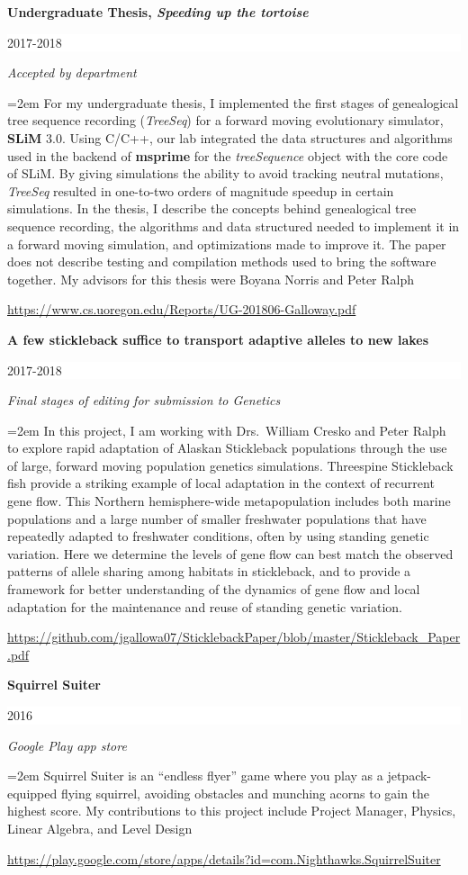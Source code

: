 \documentclass[paper=a4,fontsize=11pt]{scrartcl} %
\newcommand{\sepspace}{\vspace*{1em}}		%
\newcommand{\EducationEntry}[4]{
		\noindent \textbf{#1} \hfill      %
		\colorbox{White}{%
			\parbox{6em}{%
			\hfill\color{Black}#2}} \par  %
		\noindent \textit{#3} \par        %
		\noindent\hangindent=2em\hangafter=0 \small #4 %
		\normalsize \par}
\begin{document}
\EducationEntry{Undergraduate Thesis, \textit{Speeding up the tortoise}}{2017-2018}{Accepted by department}
{For my undergraduate thesis, I implemented the first stages of genealogical tree sequence recording (\textit{TreeSeq}) for 
a forward moving evolutionary simulator, \textbf{SLiM} $3.0$.
Using C/C++, our lab integrated the data structures and algorithms used in the backend of \textbf{msprime} for the 
\textit{treeSequence} object with the core code of SLiM. By giving simulations the ability to avoid tracking neutral mutations,
\textit{TreeSeq} resulted in one-to-two orders of magnitude speedup in certain simulations. 
In the thesis, I describe the concepts behind genealogical tree sequence recording, the algorithms 
and data structured needed to implement it in a forward moving simulation, and optimizations made 
to improve it. The paper does not describe testing and compilation methods used to bring the software together.
My advisors for this thesis were Boyana Norris and Peter Ralph
}
\url{https://www.cs.uoregon.edu/Reports/UG-201806-Galloway.pdf}
\sepspace


\EducationEntry{A few stickleback suffice to transport adaptive alleles to new lakes}{2017-2018}{Final stages of editing for submission to Genetics}
{In this project, I am working with Drs.\ William Cresko and Peter Ralph to explore rapid adaptation of Alaskan Stickleback populations 
through the use of large, forward moving population genetics simulations. 
Threespine Stickleback fish provide a striking example of local adaptation in the context of recurrent gene flow. 
This Northern hemisphere-wide metapopulation includes both marine populations and a large number of smaller freshwater populations that have repeatedly adapted to freshwater conditions, often by using standing genetic variation. 
Here we determine the levels of gene flow can best match the observed patterns of allele sharing among habitats in stickleback, 
and to provide a framework for better understanding of the dynamics of gene flow and local adaptation for the maintenance and reuse of standing genetic variation.
}
\url{https://github.com/jgallowa07/SticklebackPaper/blob/master/Stickleback_Paper.pdf}
\sepspace

\EducationEntry{Squirrel Suiter}{2016}{Google Play app store}
{Squirrel Suiter is an ``endless flyer'' game where you play as a jetpack-equipped flying squirrel,
 avoiding obstacles and munching acorns to gain the highest score. My contributions to this project include
 Project Manager, Physics, Linear Algebra,  and Level Design  }
\url{https://play.google.com/store/apps/details?id=com.Nighthawks.SquirrelSuiter}
\sepspace
\newpage
\end{document}
